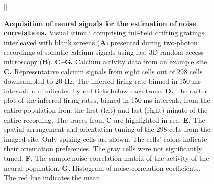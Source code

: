 \documentclass[10pt]{article}
\begin{document}
\begin{figure}    [\FBwidth]
    {\caption{{\bf Acquisition of neural signals for the estimation of noise correlations.}
    Visual stimuli comprising full-field drifting gratings interleaved with blank screens ({\bf A}) presented during two-photon recordings of somatic calcium signals using fast 3D random-access microscopy ({\bf B}). 
    {\bf C--G.} Calcium activity data from an example site.
    {\bf C.} Representative calcium signals from eight cells out of 298 cells downsampled to 20 Hz. The inferred firing rate binned in 150 ms intervals are indicated by red ticks below each trace.
    {\bf D.} The raster plot of the inferred firing rates, binned in 150 ms intervals, from the entire population from the first (left) and last (right) minute of the entire recording.  The traces from {\bf C} are highlighted in red.
    {\bf E.} The spatial arrangement and orientation tuning of the 298 cells from the imaged site. Only spiking cells are shown. The cells' colors indicate their orientation preferences. The gray cells were not significantly tuned.
    {\bf F.} The sample noise correlation matrix of the activity of the neural population. 
    {\bf G.} Histogram of noise correlation coefficients. The red line indicates the mean.
} \label{fig:03}}

\end{figure}
\end{document}
